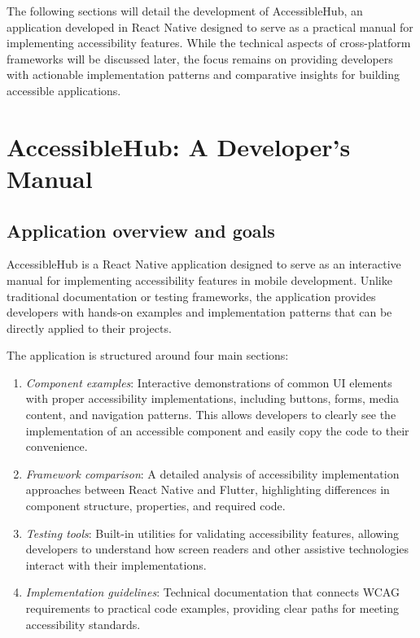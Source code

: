 The following sections will detail the development of AccessibleHub, an application developed in React Native designed to serve as a practical manual for implementing accessibility features. While the technical aspects of cross-platform frameworks will be discussed later, the focus remains on providing developers with actionable implementation patterns and comparative insights for building accessible applications.

\section{AccessibleHub: A Developer's Manual}
\label{sec:accessiblehub}

\subsection{Application overview and goals}
\label{subsec:overview-goals}

AccessibleHub is a React Native application designed to serve as an interactive manual for implementing accessibility features in mobile development. Unlike traditional documentation or testing frameworks, the application provides developers with hands-on examples and implementation patterns that can be directly applied to their projects.

The application is structured around four main sections:
\begin{enumerate}
    \item \textit{Component examples}: Interactive demonstrations of common UI elements with proper accessibility implementations, including buttons, forms, media content, and navigation patterns. This allows developers to clearly see the implementation of an accessible component and easily copy the code to their convenience.
    
    \item \textit{Framework comparison}: A detailed analysis of accessibility implementation approaches between React Native and Flutter, highlighting differences in component structure, properties, and required code.
    
    \item \textit{Testing tools}: Built-in utilities for validating accessibility features, allowing developers to understand how screen readers and other assistive technologies interact with their implementations.
    
    \item \textit{Implementation guidelines}: Technical documentation that connects WCAG requirements to practical code examples, providing clear paths for meeting accessibility standards.
\end{enumerate}

